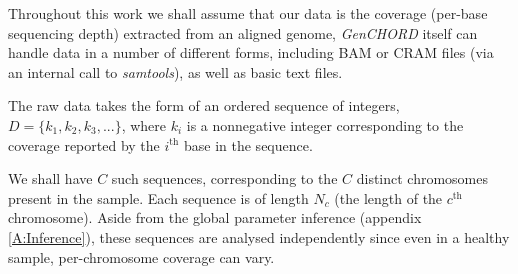 \documentclass[fleqn,usenatbib]{mnras}
\def\codename{\textit{GenCHORD}}
\begin{document}
			Throughout this work we shall assume that our data is the coverage (per-base sequencing depth) extracted from an aligned genome, \codename{} itself can handle data in a number of different forms, including BAM or CRAM files (via an internal call to \textit{samtools}), as well as basic text files. 
			
			The raw data takes the form of an ordered sequence of integers, $D = \{k_1,k_2,k_3,...\}$, where $k_i$ is a nonnegative integer corresponding to the coverage reported by the $i^\text{th}$ base in the sequence.
			
			We shall have $C$ such sequences, corresponding to the $C$ {distinct} chromosomes present in the sample. Each sequence is of length $N_c$ (the length of the $c^\text{th}$ chromosome). Aside from the global parameter inference (appendix \ref{A:Inference}), these sequences are analysed independently since even in a healthy sample, per-chromosome coverage can vary.
	
\end{document}
